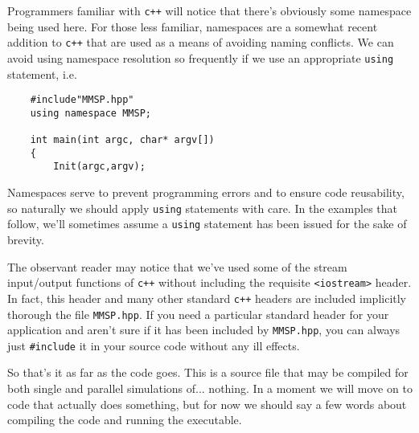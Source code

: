 \documentclass{article}
\begin{document}
Programmers familiar with {\tt c++} will notice that there's obviously some \MMSP namespace being used here.  For those less familiar, namespaces are a somewhat recent addition to {\tt c++} that are used as a means of avoiding naming conflicts.  We can avoid using namespace resolution so frequently if we use an appropriate {\tt using} statement, i.e. 
\begin{shadebox}
\begin{verbatim}
    #include"MMSP.hpp"
    using namespace MMSP;

    int main(int argc, char* argv[])
    {
        Init(argc,argv);
\end{verbatim}
\end{shadebox}
Namespaces serve to prevent programming errors and to ensure code reusability, so naturally we should apply {\tt using} statements with care.  In the examples that follow, we'll sometimes assume a {\tt using} statement has been issued for the sake of brevity.

The observant reader may notice that we've used some of the stream input/output functions of {\tt c++} without including the requisite {\tt <iostream>} header.  In fact, this header and many other standard {\tt c++} headers are included implicitly thorough the file {\tt MMSP.hpp}.  If you need a particular standard header for your application and aren't sure if it has been included by {\tt MMSP.hpp}, you can always just {\tt \#include} it in your source code without any ill effects.

So that's it as far as the code goes.  This is a source file that may be compiled for both single and parallel simulations of... nothing.  In a moment we will move on to code that actually does something, but for now we should say a few words about compiling the code and running the executable.
\end{document}
